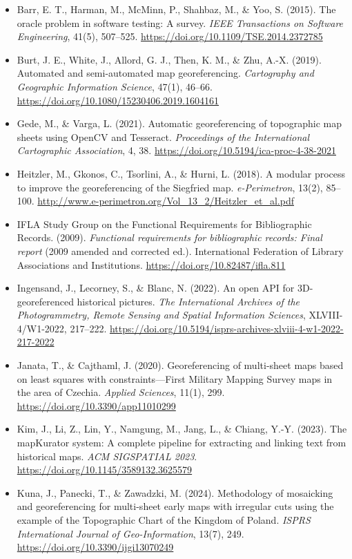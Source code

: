 \documentclass[11pt,a4paper]{article}
\begin{document}
\begin{itemize}
\item Barr, E. T., Harman, M., McMinn, P., Shahbaz, M., \& Yoo, S. (2015). The oracle problem in software testing: A survey. \emph{IEEE Transactions on Software Engineering}, 41(5), 507–525. \url{https://doi.org/10.1109/TSE.2014.2372785}
\item Burt, J. E., White, J., Allord, G. J., Then, K. M., \& Zhu, A.-X. (2019). Automated and semi-automated map georeferencing. \emph{Cartography and Geographic Information Science}, 47(1), 46–66. \url{https://doi.org/10.1080/15230406.2019.1604161}
\item Gede, M., \& Varga, L. (2021). Automatic georeferencing of topographic map sheets using OpenCV and Tesseract. \emph{Proceedings of the International Cartographic Association}, 4, 38. \url{https://doi.org/10.5194/ica-proc-4-38-2021}
\item Heitzler, M., Gkonos, C., Tsorlini, A., \& Hurni, L. (2018). A modular process to improve the georeferencing of the Siegfried map. \emph{e-Perimetron}, 13(2), 85–100. \url{http://www.e-perimetron.org/Vol_13_2/Heitzler_et_al.pdf}
\item IFLA Study Group on the Functional Requirements for Bibliographic Records. (2009). \emph{Functional requirements for bibliographic records: Final report} (2009 amended and corrected ed.). International Federation of Library Associations and Institutions. \url{https://doi.org/10.82487/ifla.811}
\item Ingensand, J., Lecorney, S., \& Blanc, N. (2022). An open API for 3D-georeferenced historical pictures. \emph{The International Archives of the Photogrammetry, Remote Sensing and Spatial Information Sciences}, XLVIII-4/W1-2022, 217–222. \url{https://doi.org/10.5194/isprs-archives-xlviii-4-w1-2022-217-2022}
\item Janata, T., \& Cajthaml, J. (2020). Georeferencing of multi-sheet maps based on least squares with constraints—First Military Mapping Survey maps in the area of Czechia. \emph{Applied Sciences}, 11(1), 299. \url{https://doi.org/10.3390/app11010299}
\item Kim, J., Li, Z., Lin, Y., Namgung, M., Jang, L., \& Chiang, Y.-Y. (2023). The mapKurator system: A complete pipeline for extracting and linking text from historical maps. \emph{ACM SIGSPATIAL 2023}. \url{https://doi.org/10.1145/3589132.3625579}
\item Kuna, J., Panecki, T., \& Zawadzki, M. (2024). Methodology of mosaicking and georeferencing for multi-sheet early maps with irregular cuts using the example of the Topographic Chart of the Kingdom of Poland. \emph{ISPRS International Journal of Geo-Information}, 13(7), 249. \url{https://doi.org/10.3390/ijgi13070249}

\end{itemize}
\end{document}
